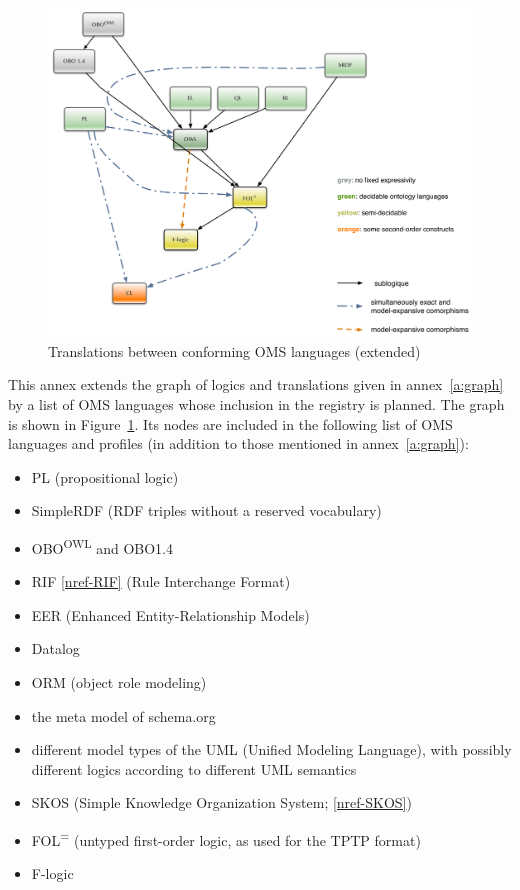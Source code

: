 \documentclass[10pt, a4paper]{isov2}
\renewcommand{\annexrefname}{annex}
\renewcommand{\figurerefname}{Figure}
\renewcommand{\noterefname}{note}
\renewcommand{\aref}[1]{\annexrefname~\ref{#1}}
\renewcommand{\fref}[1]{\figurerefname~\ref{#1}}
\renewcommand{\nref}[1]{\noterefname~\ref{#1}}
\renewcommand{\nref}[1]{\ref{nref-#1}}
\begin{document}
\begin{figure}
  \centering
  \includegraphics[width=\textwidth]{illustrations/pre-reduced-ontograph}
  \caption{Translations between conforming OMS languages (extended)}
  \label{fig:pre-ontograph}
\end{figure}
This annex extends the graph of logics and translations given in
\aref{a:graph} by a list of OMS languages  whose inclusion in
the registry is planned.  The graph is shown in
\fref{fig:pre-ontograph}.  Its nodes are included in the following
list of OMS languages and profiles (in addition to those
mentioned in \aref{a:graph}):
 \begin{itemize} 
\item PL (propositional logic)
\item SimpleRDF (RDF triples without a reserved vocabulary)
\item OBO\textsuperscript{OWL} and OBO1.4
\item RIF \nref{RIF} (Rule Interchange Format)
\item EER (Enhanced Entity-Relationship Models) %
\item Datalog
\item ORM (object role modeling)
\item the meta model of schema.org
\item different model types of the UML (Unified Modeling Language), with possibly different logics according to different
UML semantics
\item SKOS (Simple Knowledge Organization System; \nref{SKOS})
\item FOL\textsuperscript{=} (untyped first-order logic, as used for the
TPTP format)
\item F-logic
 \end{itemize} 
\end{document}
